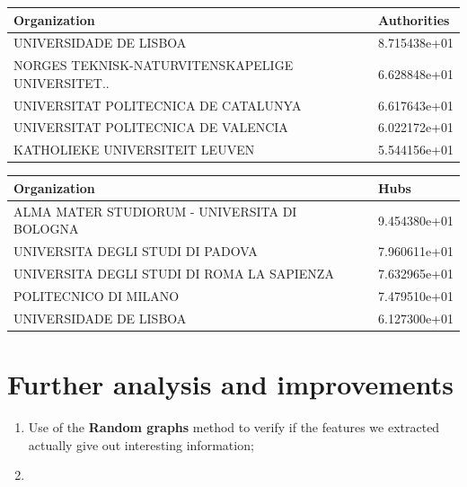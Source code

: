     \begin{table}[hbtp]
        \parbox{.25\linewidth}{
        \centering
        \begin{tabular}{l l}
            \hline
            \textbf{Organization} & \textbf{Authorities} \\ \hline
            UNIVERSIDADE DE LISBOA & 8.715438e+01 \\
            NORGES TEKNISK-NATURVITENSKAPELIGE UNIVERSITET.. & 6.628848e+01 \\
            UNIVERSITAT POLITECNICA DE CATALUNYA & 6.617643e+01 \\
            UNIVERSITAT POLITECNICA DE VALENCIA & 6.022172e+01 \\
            KATHOLIEKE UNIVERSITEIT LEUVEN & 5.544156e+01 \\ \hline
          \end{tabular}
          \label{tab:table-label}
        }
        \end{table}
        \begin{table}[H]
        \parbox{.25\linewidth}{
        \centering
        \begin{tabular}{l l}
            \hline
            \textbf{Organization} & \textbf{Hubs} \\ \hline
            ALMA MATER STUDIORUM - UNIVERSITA DI BOLOGNA & 9.454380e+01 \\
            UNIVERSITA DEGLI STUDI DI PADOVA & 7.960611e+01 \\
            UNIVERSITA DEGLI STUDI DI ROMA LA SAPIENZA & 7.632965e+01 \\
            POLITECNICO DI MILANO & 7.479510e+01 \\
            UNIVERSIDADE DE LISBOA & 6.127300e+01 \\ \hline
          \end{tabular}
          \label{tab:table-label}
        }
        \end{table}
    
    \section{Further analysis and improvements}
    \begin{enumerate}
        \item Use of the \textbf{Random graphs} method to verify if the features we extracted actually give out interesting information;
        \item 
    \end{enumerate} 
    